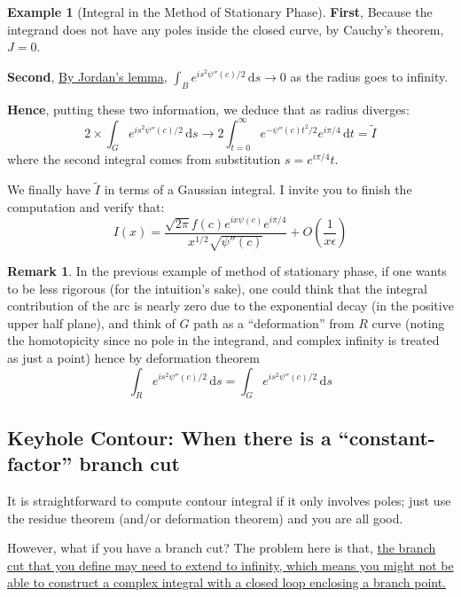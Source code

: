 \documentclass[a4paper, 12pt]{article}
\theoremstyle{definition}
\newtheorem{example}{Example}
\newtheorem{remark}{Remark}
\numberwithin{theorem}{section}
\numberwithin{definition}{section}
\numberwithin{exercise}{section}
\numberwithin{remark}{section}
\numberwithin{figure}{section}
\numberwithin{example}{section}
\newcommand{\intd}{\,\text{d}}
\begin{document}
\begin{example}[Integral in the Method of Stationary Phase]
    
    \textbf{First},
    Because the integrand does not have any poles inside the closed curve,
    by Cauchy's theorem, $J = 0$.

    \textbf{Second},
    \ul{By Jordan's lemma}, $\int_B e^{is^2 \psi''(c)/2} \intd s \rightarrow 0$ as the radius goes to infinity.

    \textbf{Hence},
    putting these two information,
    we deduce that as radius diverges:
    \begin{equation*}
        2 \times \int_G e^{i s^2 \psi''(c) / 2} \intd s
        \rightarrow 2 \int_{t=0}^{\infty} e^{-\psi''(c)t^2/2} e^{i \pi / 4}\intd t
        =
        \tilde I  
    \end{equation*}
    where the second integral comes from substitution $s = e^{i\pi/4} t$.
    
    We finally have $\tilde I$ in terms of a Gaussian integral.
    I invite you to finish the computation and verify that:
    \begin{equation*}
        I(x) = \frac{\sqrt{2\pi} f(c) e^{ix\psi(c)}e^{i\pi/4}}{x^{1/2} \sqrt{\psi''(c)}} + O \left( \frac{1}{x \epsilon} \right)
    \end{equation*}
\end{example}
\begin{remark}
    In the previous example of method of stationary phase,
    if one wants to be less rigorous (for the intuition's sake),
    one could think that the integral contribution of the arc is nearly zero due to the exponential decay (in the positive upper half plane),
    and think of $G$ path as a ``deformation'' from $R$ curve (noting the homotopicity since no pole in the integrand, and complex infinity is treated as just a point)
    hence by deformation theorem
    \begin{equation*}
        \int_{R} e^{is^2 \psi''(c)/2} \intd s
        =
        \int_{G} e^{is^2 \psi''(c)/2} \intd s
    \end{equation*}
\end{remark}

\subsection{Keyhole Contour: When there is a ``constant-factor'' branch cut}
It is straightforward to compute contour integral if it only involves poles;
just use the residue theorem (and/or deformation theorem) and you are all good.

However, what if you have a branch cut?
The problem here is that, \ul{the branch cut that you define may need to extend to infinity,
which means you might not be able to construct a complex integral with a closed loop
enclosing a branch point.}
\end{document}
